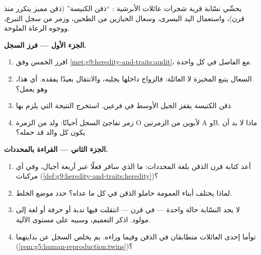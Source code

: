 \begin{problem}\label{pb:g9:heredity-and-traits:1}
يحشّي نسّابة قرية شجرات عائلات الأبرشية : ``ذقن
الكنيسة'' (ذقن مميز يتكرر منذ قرن)، واستعمال اليد
اليسرى، وسعال  الخبازين من الطحين، وزمر  من سجل
التبرع، ووجوه الرعاة الملوحة.

\medskip\noindent\textbf{الجزء الأول --- فرز
السجل.}
\begin{enumerate}
  \item افرز  الخمس وفق
        \cref{met:g9:heredity-and-traits:audit}، مع
         الفاصل في كل واحدة.
  \item السعال يتبع المخبزة لا العائلة: فالزواج داخلها
        يجلبه، والانتقال بعيدًا يفقده. أي  هذا، وهو
        يعمل؟
  \item ذقن الكنيسة يقفز الجيل الأوسط في فرعين. استخرج
        النتيجة التي يلزم بها.
  \item زمر  تفاجئ السجل أحيانًا: ولد من الزمرة O
        لأبوين من الزمرتين A وB. ماذا لا بد أن يكون كل
        والد قد حمله؟
\end{enumerate}

\medskip\noindent\textbf{الجزء الثاني --- القراءة
بالمحددات.}
\begin{enumerate}[resume]
  \item أعد كتابة قرن الذقن بلغة المحددات: ما الذي سافر
        فعلًا عبر أربعة أجيال، وفي أي مركبات
        (\cref{def:g9:heredity-and-traits:heredity})؟
  \item لماذا يختلف أبناء العمومة حاملو الذقن في كل ما
        عداه؟ حدد موضع الخلط.
  \item لا يجد النسّابة حالة واحدة --- في قرن --- انتقلت
        فيها ندبة أو حرفة أو لغة إلى مولود. اذكر
        التعميم، وسببه على مستوى الآلية.
  \item توأما إحدى العائلات متطابقان في الذقن وفيما
        وراءه. بم يخلص السجل عن بدايتهما
        (\cref{rem:g5:human-reproduction:twins})؟
\end{enumerate}


\end{problem}

